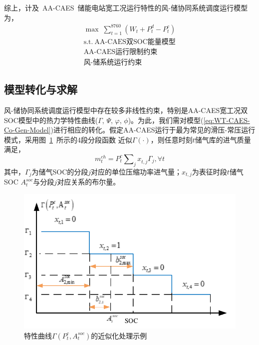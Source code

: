 综上，计及~AA-CAES~储能电站宽工况运行特性的风-储协同系统调度运行模型为，
\begin{subequations}
\label{eq:WT-CAES-Co-Gen-Model}
\begin{gather}
\max \;\sum\limits_{t = 1}^{8760} {({W_t} + P_t^d - P_t^c)}\label{eq:CAES-Hub-dispatch-obj}\\
\mbox{s.t.}~
\mbox{AA-CAES双SOC能量模型}\\
\mbox{AA-CAES运行限制约束}\\
\mbox{风-储系统运行约束} 
\end{gather}
\end{subequations}

\subsection{模型转化与求解}
\label{sec:wind-ESS-operation-model-appro}

风-储协同系统调度运行模型中存在较多非线性约束，特别是AA-CAES宽工况双SOC模型中的热力学特性曲线($\Gamma$, $\Psi$, $\varphi$, $\phi$)。为此，我们需对模型(\ref{eq:WT-CAES-Co-Gen-Model})进行相应的转化。假定AA-CAES运行于最为常见的滑压-常压运行模式，采用图~\ref{fig:dual-SOC-approx}~所示的4段分段函数
\cite{CAES-Reserve-Bid-Therm-16}近似$\Gamma(\cdot)$，则任意时刻$t$储气库的进气质量满足，
\begin{equation}
\label{equ:non-dual-SOC-approx}
m_t^{ch} = P_t^c\sum\nolimits_j {x_{t,j}^{}} {\Gamma _j}, \forall t
\end{equation}
其中，$\Gamma_j$为储气SOC的分段$j$对应的单位压缩功率进气量；$x_{t,j}$为表征时段$t$储气SOC $A_t^{soc}$与分段$j$对应关系的布尔量。

\begin{figure}[H] %
  \centering
  \includegraphics[scale=0.85]{figures/Chap3-3-dual-SOC-approx.pdf}
  \caption{特性曲线$\Gamma \left( {P_t^c,A_t^{soc}} \right)$的近似化处理示例}
  \label{fig:dual-SOC-approx}
\end{figure}

